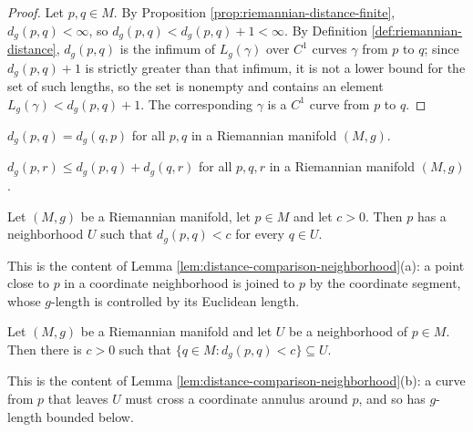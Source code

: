 \begin{proof}
\leanok
{}
Let $p, q \in M$. By Proposition \ref{prop:riemannian-distance-finite}, $d_g(p,q) < \infty$,
so $d_g(p,q) < d_g(p,q) + 1 < \infty$. By Definition \ref{def:riemannian-distance},
$d_g(p,q)$ is the infimum of $L_g(\gamma)$ over $C^1$ curves $\gamma$ from $p$ to $q$; since
$d_g(p,q) + 1$ is strictly greater than that infimum, it is not a lower bound for the set of
such lengths, so the set is nonempty and contains an element $L_g(\gamma) < d_g(p,q)+1$. The
corresponding $\gamma$ is a $C^1$ curve from $p$ to $q$.
\end{proof}

\begin{lemma}
\label{lem:riemannian-distance-symm}
\mathlibok
{}
$d_g(p,q) = d_g(q,p)$ for all $p, q$ in a Riemannian manifold $(M,g)$.
\end{lemma}

\begin{lemma}
\label{lem:riemannian-distance-triangle}
\mathlibok
{}
$d_g(p,r) \le d_g(p,q) + d_g(q,r)$ for all $p, q, r$ in a Riemannian manifold $(M,g)$.
\end{lemma}

\begin{lemma}
\label{lem:riemannian-distance-locally-small}
\mathlibok
{}
Let $(M,g)$ be a Riemannian manifold, let $p \in M$ and let $c > 0$. Then $p$ has a
neighborhood $U$ such that $d_g(p,q) < c$ for every $q \in U$.

This is the content of Lemma \ref{lem:distance-comparison-neighborhood}(a): a point
close to $p$ in a coordinate neighborhood is joined to $p$ by the coordinate segment,
whose $g$-length is controlled by its Euclidean length.
\end{lemma}

\begin{lemma}
\label{lem:riemannian-distance-small-implies-nearby}
\mathlibok
{}
Let $(M,g)$ be a Riemannian manifold and let $U$ be a neighborhood of $p \in M$. Then
there is $c > 0$ such that $\{q \in M : d_g(p,q) < c\} \subseteq U$.

This is the content of Lemma \ref{lem:distance-comparison-neighborhood}(b): a curve
from $p$ that leaves $U$ must cross a coordinate annulus around $p$, and so has
$g$-length bounded below.
\end{lemma}

